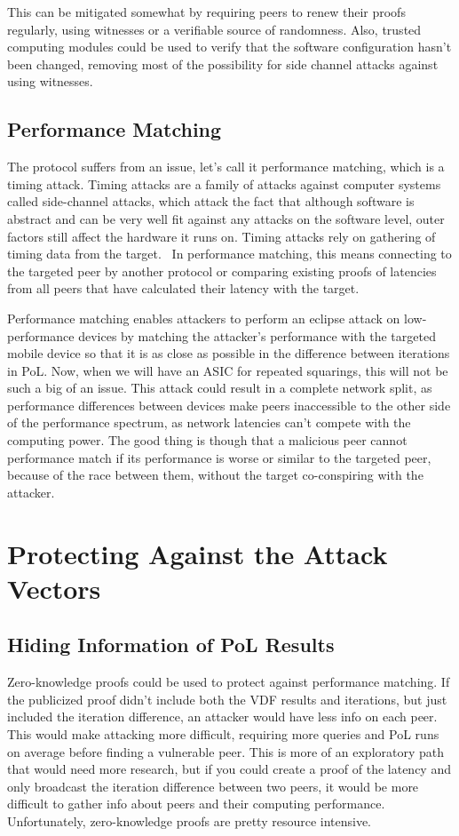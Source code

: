 This can be mitigated somewhat by requiring peers to renew their proofs regularly, using witnesses or a verifiable source of randomness. Also, trusted computing modules could be used to verify that the software configuration hasn't been changed, removing most of the possibility for side channel attacks against using witnesses.

\subsection{Performance Matching}
The protocol suffers from an issue, let's call it performance matching, which is a timing attack. Timing attacks are a family of attacks against computer systems called side-channel attacks, which attack the fact that although software is abstract and can be very well fit against any attacks on the software level, outer factors still affect the hardware it runs on. Timing attacks rely on gathering of timing data from the target.~\cite{noauthor_undated-mp} In performance matching, this means connecting to the targeted peer by another protocol or comparing existing proofs of latencies from all peers that have calculated their latency with the target.

Performance matching enables attackers to perform an eclipse attack on low-performance devices by matching the attacker's performance with the targeted mobile device so that it is as close as possible in the difference between iterations in PoL. Now, when we will have an ASIC for repeated squarings, this will not be such a big of an issue. This attack could result in a complete network split, as performance differences between devices make peers inaccessible to the other side of the performance spectrum, as network latencies can't compete with the computing power. The good thing is though that a malicious peer cannot performance match if its performance is worse or similar to the targeted peer, because of the race between them, without the target co-conspiring with the attacker.

\section{Protecting Against the Attack Vectors}
\subsection{Hiding Information of PoL Results}
Zero-knowledge proofs could be used to protect against performance matching. If the publicized proof didn't include both the VDF results and iterations, but just included the iteration difference, an attacker would have less info on each peer. This would make attacking more difficult, requiring more queries and PoL runs on average before finding a vulnerable peer. This is more of an exploratory path that would need more research, but if you could create a proof of the latency and only broadcast the iteration difference between two peers, it would be more difficult to gather info about peers and their computing performance. Unfortunately, zero-knowledge proofs are pretty resource intensive.


